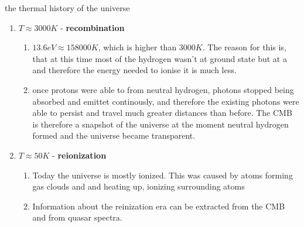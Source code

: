 \documentclass{alex_hü}
\begin{document}
\begin{mybox}{the thermal history of the universe}
\begin{enumerate}[label=\arabic*)]
	\item \( T \approx 3000 \unit{K} \) - \textbf{recombination}
		\begin{enumerate}
			\item \( 13.6 \unit{eV} \approx 158 000 \unit{K} \), which is higher than \( 3000 \unit{K} \). The reason for this is, that at this time most of the hydrogen wasn't at ground state but at a and therefore the energy needed to ionise it is much less.
			\item once protons were able to from neutral hydrogen, photons stopped being absorbed and emittet continously, and therefore the existing photons were able to persist and travel much greater distances than before. The CMB is therefore a snapshot of the universe at the moment neutral hydrogen formed and the universe became transparent.
		\end{enumerate}
	\tcbline
	\item \( T \approx 50 \unit{K} \) - \textbf{reionization}
		\begin{enumerate}
			\item Today the universe is mostly ionized. This was caused by atoms forming gas clouds and and heating up, ionizing surrounding atoms
			\item Information about the reinization era can be extracted from the CMB and from quasar spectra.
		\end{enumerate}
	\end{enumerate}
\end{mybox}
\end{document}
